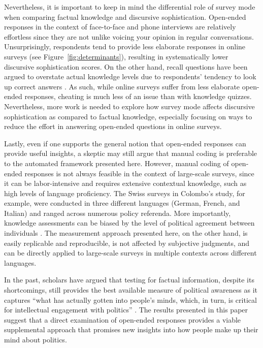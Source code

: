 Nevertheless, it is important to keep in mind the differential role of survey mode when comparing factual knowledge and discursive sophistication. Open-ended responses in the context of face-to-face and phone interviews are relatively effortless since they are not unlike voicing your opinion in regular conversations. Unsurprisingly, respondents tend to provide less elaborate responses in online surveys (see Figure~\ref{fig:determinants}), resulting in systematically lower discursive sophistication scores. On the other hand, recall questions have been argued to overstate actual knowledge levels due to respondents' tendency to look up correct answers \citep{clifford2016cheating}. As such, while online surveys suffer from less elaborate open-ended responses, cheating is much less of an issue than with knowledge quizzes. Nevertheless, more work is needed to explore how survey mode affects discursive sophistication as compared to factual knowledge, especially focusing on ways to reduce the effort in answering open-ended questions in online surveys.

Lastly, even if one supports the general notion that open-ended responses can provide useful insights, a skeptic may still argue that manual coding is preferable to the automated framework presented here. However, manual coding of open-ended responses is not always feasible in the context of large-scale surveys, since it can be labor-intensive and requires extensive contextual knowledge, such as high levels of language proficiency. The Swiss surveys in Colombo's \citeyearpar{colombo2016justifications} study, for example, were conducted in three different languages (German, French, and Italian) and ranged across numerous policy referenda. More importantly, knowledge assessments can be biased by the level of political agreement between individuals \citep[e.g.,][]{ryan2011accuracy}. The measurement approach presented here, on the other hand, is easily replicable and reproducible, is not affected by subjective judgments, and can be directly applied to large-scale surveys in multiple contexts across different languages.

In the past, scholars have argued that testing for factual information, despite its shortcomings, still provides the best available measure of political awareness as it captures ``what has actually gotten into people's minds, which, in turn, is critical for intellectual engagement with politics'' \citet[21]{zaller1992nature}. The results presented in this paper suggest that a direct examination of open-ended responses provides a viable supplemental approach that promises new insights into how people make up their mind about politics.

